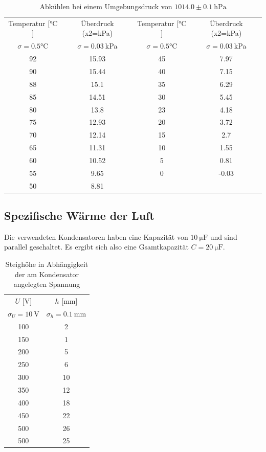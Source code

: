 \documentclass[12pt,a4paper,titlepage,headinclude,bibtotoc]{scrartcl}
\begin{document}
\begin{table}[!htb]
	\centering	
	\begin{tabular}{|c|c||c|c|}
	\hline
	Temperatur [$\si{\celsius}$]  & Überdruck (x2=kPa)&
	Temperatur [$\si{\celsius}$]  & Überdruck (x2=kPa)\\
	$\sigma=0.5\si{\celsius}$ & $\sigma=0.03~$kPa &
	$\sigma=0.5\si{\celsius}$ & $\sigma=0.03~$kPa \\
	\hline
	92	&	15.93	&	45	&	7.97	\\
	90	&	15.44	&	40	&	7.15	\\
	88	&	15.1	&	35	&	6.29	\\
	85	&	14.51	&	30	&	5.45	\\
	80	&	13.8	&	23	&	4.18	\\
	75	&	12.93	&	20	&	3.72	\\
	70	&	12.14	&	15	&	2.7	\\
	65	&	11.31	&	10	&	1.55	\\
	60	&	10.52	&	5	&	0.81	\\
	55	&	9.65	&	0	&	-0.03	\\
	50	&	8.81	&		&		\\
	\hline
	\end{tabular}
	\caption{Abkühlen  bei einem Umgebungsdruck von $1014.0\pm 0.1~\si{\hecto\pascal}$}
\end{table}

\subsection{Spezifische Wärme der Luft}
Die verwendeten Kondensatoren haben eine Kapazität von $10~\si{\micro\farad}$ und sind parallel geschaltet.
Es ergibt sich also eine Gsamtkapazität $C=20~\si{\micro\farad}$.

\begin{table}[!htb]
	\centering
	\begin{tabular}{|c|c|}
	\hline
	$U$ [V] & $h$ [mm]\\
	$\sigma_U=10~$V & $\sigma_h=0.1~$mm\\
	\hline
	100	&	2	\\
	150	&	1	\\
	200	&	5	\\
	250	&	6	\\
	300	&	10	\\
	350	&	12	\\
	400	&	18	\\
	450	&	22	\\
	500	&	26	\\
	500	&	25	\\	
	\hline
	\end{tabular}
	\caption{Steighöhe in Abhängigkeit der am Kondensator angelegten Spannung}
\end{table}
\end{document}
